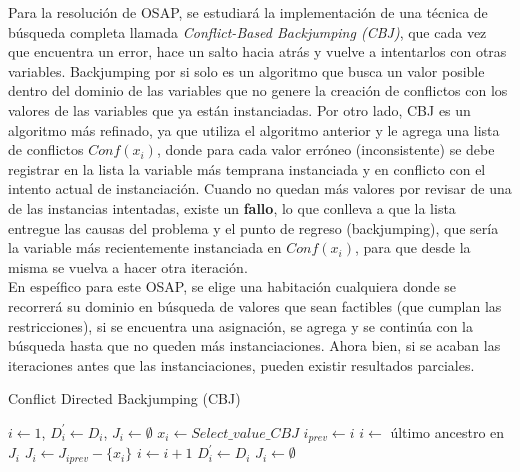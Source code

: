 \documentclass[letter, 10pt]{article}
\begin{document}
Para la resoluci\'on de OSAP, se estudiar\'a la implementaci\'on de una t\'ecnica de b\'usqueda completa llamada \textit{Conflict-Based Backjumping (CBJ)}, que cada vez que encuentra un error, hace un salto hacia atr\'as y vuelve a intentarlos con otras variables. Backjumping por si solo es un algoritmo que busca un valor posible dentro del dominio de las variables que no genere la creaci\'on de conflictos con los valores de las variables que ya est\'an instanciadas. Por otro lado, CBJ es un algoritmo m\'as refinado, ya que utiliza el algoritmo anterior y le agrega una lista de conflictos $Conf(x_i)$, donde para cada valor err\'oneo (inconsistente) se debe registrar en la lista la variable m\'as temprana instanciada y en conflicto con el intento actual de instanciaci\'on.
Cuando no quedan m\'as valores por revisar de una de las instancias intentadas, existe un \textbf{fallo}, lo que conlleva a que la lista entregue las causas del problema y el punto de regreso (backjumping), que ser\'ia la variable m\'as recientemente instanciada en $Conf(x_i)$, para que desde la misma se vuelva a hacer otra iteraci\'on. \\
En espe\'ifico para este OSAP, se elige una habitaci\'on cualquiera donde se recorrer\'a su dominio en b\'usqueda de valores que sean factibles (que cumplan las restricciones), si se encuentra una asignaci\'on, se agrega y se contin\'ua con la b\'usqueda hasta que no queden m\'as instanciaciones. Ahora bien, si se acaban las iteraciones antes que las instanciaciones, pueden existir resultados parciales.

\begin{algorithm}[H]
\caption{Conflict Directed Backjumping (CBJ) }\label{alg:CBJ}
\begin{algorithmic}[1]
    \State $i \gets 1$, $D_{i}^{'} \gets D_i$, $ J_i \gets \emptyset$ 
    \State $x_i \gets Select\_value\_CBJ$
     
        \State $i_{prev} \gets i$
        \State $i \gets $ \'ultimo ancestro en $J_i$ 
        \State $J_i \gets J_{iprev} - \{x_i\}$ 
    \Else
        \State $i \gets i + 1$ 
        \State $ D_{i}^{'} \gets D_i$ 
        \State $ J_i \gets \emptyset$ 
    \EndIf
    \EndWhile
\end{algorithmic}
\end{algorithm}
\end{document}
